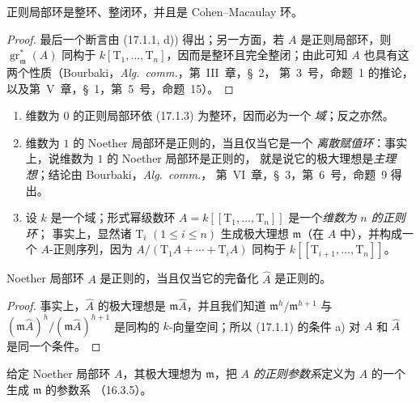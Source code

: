\begin{corollary}[17.1.3]
\label{0.17.1.3-fr}
正则局部环是整环、整闭环，并且是 Cohen--Macaulay 环。
\end{corollary}

\begin{proof}
最后一个断言由 (17.1.1, d)) 得出；另一方面，若 $A$ 是正则局部环，则
$\operatorname{gr}^*_{\mathfrak{m}}(A)$ 同构于
$k[\mathrm{T}_1,\ldots,\mathrm{T}_n]$，因而是整环且完全整闭；由此可知 $A$
也具有这两个性质（Bourbaki，\emph{Alg.~comm.}，第~III~章，\S~2，
第~3~号，命题~1 的推论，以及第~V~章，\S~1，第~5~号，命题~15）。
\end{proof}

\begin{examples}[17.1.4]
\label{0.17.1.4-fr}
\begin{enumerate}
  \item[\rm (i)] 维数为 $0$ 的正则局部环依 (17.1.3) 为整环，因而必为一个
  \emph{域}；反之亦然。
  \item[\rm (ii)] 维数为 $1$ 的 Noether 局部环是正则的，当且仅当它是一个
  \emph{离散赋值环}：事实上，说维数为 $1$ 的 Noether 局部环是正则的，
  就是说它的极大理想是\emph{主理想}；结论由 Bourbaki，\emph{Alg.~comm.}，
  第~VI~章，\S~3，第~6~号，命题~9 得出。
  \item[\rm (iii)] 设 $k$ 是一个域；形式幂级数环
  $A=k[[\mathrm{T}_1,\ldots,\mathrm{T}_n]]$ 是一个\emph{维数为 $n$ 的正则环}；
  事实上，显然诸 $\mathrm{T}_i$ $(1\leq i\leq n)$ 生成极大理想
  $\mathfrak{m}$（在 $A$ 中），并构成一个 $A$-正则序列，因为
  $A/(\mathrm{T}_1A+\cdots+\mathrm{T}_iA)$ 同构于
  $k[[\mathrm{T}_{i+1},\ldots,\mathrm{T}_n]]$。
\end{enumerate}
\end{examples}

\begin{proposition}[17.1.5]
\label{0.17.1.5-fr}
Noether 局部环 $A$ 是正则的，当且仅当它的完备化 $\widehat{A}$ 是正则的。
\end{proposition}

\begin{proof}
事实上，$\widehat{A}$ 的极大理想是 $\mathfrak{m}\widehat{A}$，并且我们知道
$\mathfrak{m}^h/\mathfrak{m}^{h+1}$ 与
$(\mathfrak{m}\widehat{A})^h/(\mathfrak{m}\widehat{A})^{h+1}$ 是同构的
$k$-向量空间；所以 (17.1.1) 的条件 a) 对 $A$ 和 $\widehat{A}$ 是同一个条件。
\end{proof}

\begin{definition}[17.1.6]
\label{0.17.1.6-fr}
给定 Noether 局部环 $A$，其极大理想为 $\mathfrak{m}$，把
\emph{$A$ 的正则参数系}定义为 $A$ 的一个生成 $\mathfrak{m}$ 的参数系
（16.3.5）。
\end{definition}

